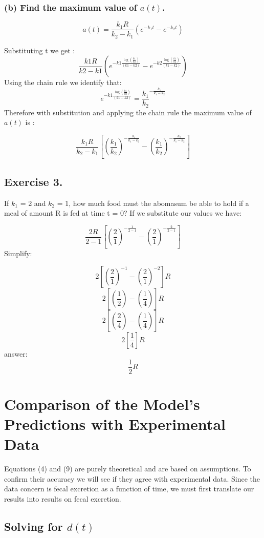 \documentclass[]{article}
\begin{document}
\newpage

\subsubsection{\texorpdfstring{(b) Find the maximum value of
\(a(t)\).}{(b) Find the maximum value of a(t).}}\label{b-find-the-maximum-value-of-at.}

\[a(t) = \frac{k_1R}{k_2-k_1}(e^{-k_1t}-e^{-k_2t})\]

Substituting t we get :
\[\frac{k1 R}{k2 - k1}(e^{-k1 \frac{\log{(\frac{k1}{k2})}}{(k1 - k2)}}-e^{-k2 \frac{\log{(\frac{k1}{k2})}}{(k1 - k2)}})\]
Using the chain rule we identify that:
\[e^{-k1 \frac{\log{(\frac{k1}{k2})}}{(k1 - k2)}}=\frac{k_1}{k_2}^{-\frac{k_1}{k_1 - k_2}}\]
Therefore with substitution and applying the chain rule the maximum
value of \(a(t)\) is :

\[\frac{k_1R}{k_2-k_1}[(\frac{k_1}{k_2})^{-\frac{k_1}{k_1-k_2}}-(\frac{k_1}{k_2})^{-\frac{k_2}{k_1-k_2}}]\]

\subsection{Exercise 3.}\label{exercise-3.}

If \(k_1\) = 2 and \(k_2\) = 1, how much food must the abomasum be able
to hold if a meal of amount R is fed at time t = 0? If we substitute our
values we have:

\[\frac{2 R}{2 - 1}[(\frac{2}{1})^{-\frac{1}{2-1}}-(\frac{2}{1})^{-\frac{2}{2-1}}]\]
Simplify:

\[2[(\frac{2}{1})^{-1}-(\frac{2}{1})^{-2}]R\]
\[2[(\frac{1}{2})-(\frac{1}{4})]R\] \[2[(\frac{2}{4})-(\frac{1}{4})]R\]
\[2[\frac{1}{4}]R\] answer: \[\frac{1}{2}R\]

\newpage

\section{Comparison of the Model's Predictions with Experimental
Data}\label{comparison-of-the-models-predictions-with-experimental-data}

Equations (4) and (9) are purely theoretical and are based on
assumptions. To confirm their accuracy we will see if they agree with
experimental data. Since the data concern is fecal excretion as a
function of time, we must first translate our results into results on
fecal excretion.

\subsection{\texorpdfstring{Solving for
\(d(t)\)}{Solving for d(t)}}\label{solving-for-dt}
\end{document}
